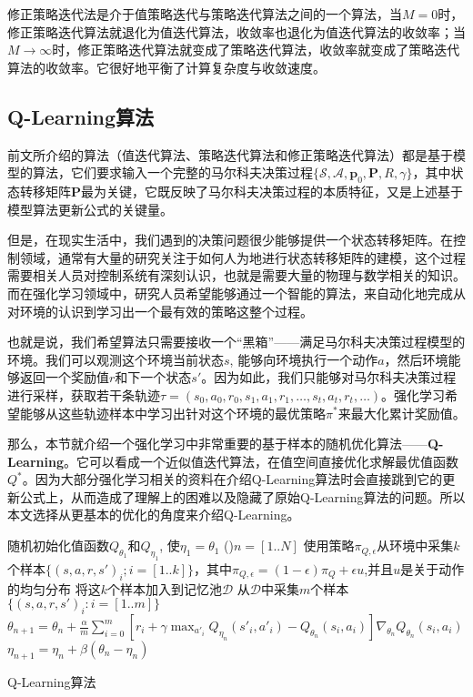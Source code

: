 修正策略迭代法是介于值策略迭代与策略迭代算法之间的一个算法，当$M=0$时，修正策略迭代算法就退化为值迭代算法，收敛率也退化为值迭代算法的收敛率；当$M\rightarrow\infty$时，修正策略迭代算法就变成了策略迭代算法，收敛率就变成了策略迭代算法的收敛率。它很好地平衡了计算复杂度与收敛速度。

\subsection{Q-Learning算法}
前文所介绍的算法（值迭代算法、策略迭代算法和修正策略迭代算法）都是基于模型的算法，它们要求输入一个完整的马尔科夫决策过程$\{\mathcal{S}, \mathcal{A}, \mathbf{p}_0, \mathbf{P}, R, \gamma\}$，其中状态转移矩阵$\mathbf{P}$最为关键，它既反映了马尔科夫决策过程的本质特征，又是上述基于模型算法更新公式的关键量。

但是，在现实生活中，我们遇到的决策问题很少能够提供一个状态转移矩阵。在控制领域，通常有大量的研究关注于如何人为地进行状态转移矩阵的建模，这个过程需要相关人员对控制系统有深刻认识，也就是需要大量的物理与数学相关的知识。而在强化学习领域中，研究人员希望能够通过一个智能的算法，来自动化地完成从对环境的认识到学习出一个最有效的策略这整个过程。

也就是说，我们希望算法只需要接收一个``黑箱''——满足马尔科夫决策过程模型的环境。我们可以观测这个环境当前状态$s$, 能够向环境执行一个动作$a$，然后环境能够返回一个奖励值$r$和下一个状态$s'$。因为如此，我们只能够对马尔科夫决策过程进行采样，获取若干条轨迹$\tau = (s_0, a_0, r_0,  s_1, a_1, r_1, \ldots, s_t, a_t, r_t, \ldots)$。强化学习希望能够从这些轨迹样本中学习出针对这个环境的最优策略$\pi^*$来最大化累计奖励值。

那么，本节就介绍一个强化学习中非常重要的基于样本的随机优化算法——\textbf{Q-Learning}\cite{watkins1989learning}。它可以看成一个近似值迭代算法，在值空间直接优化求解最优值函数$Q^*$。因为大部分强化学习相关的资料在介绍Q-Learning算法时会直接跳到它的更新公式上，从而造成了理解上的困难以及隐藏了原始Q-Learning算法的问题。所以本文选择从更基本的优化的角度来介绍Q-Learning。

\begin{algorithm}[htbp]
    \LinesNumbered
    随机初始化值函数$Q_{\theta_1}$和$Q_{\eta_1}$, 使$\eta_1 = \theta_1$\;
    \For(){$n = [1 .. N]$}{
        使用策略$\pi_{Q, \epsilon}$从环境中采集$k$个样本$\{(s, a, r, s')_i; i = [1..k]\}$，其中$\pi_{Q, \epsilon} = (1 - \epsilon) \pi_Q + \epsilon u$,并且$u$是关于动作的均匀分布\;
        将这$k$个样本加入到记忆池$\mathcal{D}$\;
        从$\mathcal{D}$中采集$m$个样本$\{(s, a, r, s')_i: i = [1 .. m]\}$\;
        $\theta_{n+1} = \theta_n + \frac{\alpha}{m} \sum^m_{i=0}[r_i + 
        \gamma \max_{a'_i} Q_{\eta_n}(s'_i, a'_i) - Q_{\theta_n}(s_i, a_i)]
        \nabla_{\theta_n}Q_{\theta_n}(s_i, a_i) $\;
        $\eta_{n+1} = \eta_n + \beta (\theta_n - \eta_n)$\;
    }
    \caption{Q-Learning算法}
\end{algorithm}

